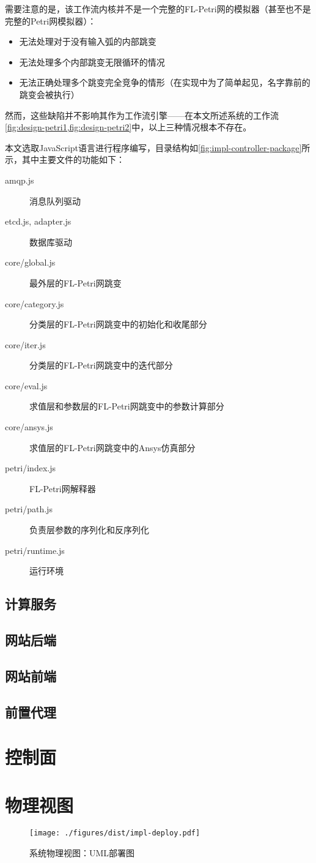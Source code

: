 \documentclass[index]{subfiles}
\begin{document}
需要注意的是，该工作流内核并不是一个完整的FL-Petri网的模拟器（甚至也不是完整的Petri网模拟器）：
\begin{itemize}
  \item 无法处理对于没有输入弧的内部跳变
  \item 无法处理多个内部跳变无限循环的情况
  \item 无法正确处理多个跳变完全竞争的情形（在实现中为了简单起见，名字靠前的跳变会被执行）
\end{itemize}
然而，这些缺陷并不影响其作为工作流引擎——在本文所述系统的工作流\cref{fig:design-petri1,fig:design-petri2}中，以上三种情况根本不存在。

本文选取JavaScript语言进行程序编写，目录结构如\cref{fig:impl-controller-package}所示，其中主要文件的功能如下：
\begin{description}
  \item[amqp.js] 消息队列驱动
  \item[etcd.js, adapter.js] 数据库驱动
  \item[core/global.js] 最外层的FL-Petri网跳变
  \item[core/category.js] 分类层的FL-Petri网跳变中的初始化和收尾部分
  \item[core/iter.js] 分类层的FL-Petri网跳变中的迭代部分
  \item[core/eval.js] 求值层和参数层的FL-Petri网跳变中的参数计算部分
  \item[core/ansys.js] 求值层的FL-Petri网跳变中的Ansys仿真部分
  \item[petri/index.js] FL-Petri网解释器
  \item[petri/path.js] 负责层参数的序列化和反序列化
  \item[petri/runtime.js] 运行环境
\end{description}

\subsection{计算服务}
\subsection{网站后端}
\subsection{网站前端}
\subsection{前置代理}

\section{控制面}\label{sec:impl-elk}
\section{物理视图}
\begin{figure}[h]
  \centering
  \texttt{[image: ./figures/dist/impl-deploy.pdf]}
  \caption{系统物理视图：UML部署图\label{fig:impl-deploy}}
\end{figure}
\end{document}
